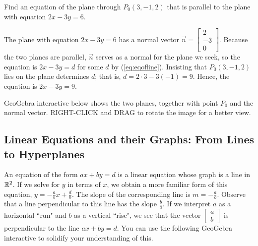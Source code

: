 \documentclass{ximera}
\begin{document}
\begin{example}\label{ex:planeparalleltoplane}
Find an equation of the plane through $P_{0}(3, -1, 2)$ that is parallel to the plane with equation $2x - 3y = 6$.

\begin{explanation}
The plane with equation $2x -3y = 6$ has a normal vector $\vec{n} =
\begin{bmatrix}
2\\
-3\\
0
\end{bmatrix}$. Because the two planes are parallel, $\vec{n}$ serves as a normal for the plane we seek, so the equation is $2x - 3y = d$ for some $d$ by (\ref{eq:eqofline}). Insisting that $P_{0}(3, -1, 2)$ lies on the plane determines $d$; that is, $d = 2 \cdot 3 - 3(-1) = 9$. Hence, the equation is $2x - 3y = 9$.

GeoGebra interactive below shows the two planes, together with point $P_0$ and the normal vector.  RIGHT-CLICK and DRAG to rotate the image for a better view.


\begin{onlineOnly}
\begin{center} 
\end{center}
\end{onlineOnly}
\end{explanation}
\end{example}

\subsection*{Linear Equations and their Graphs: From Lines to Hyperplanes}
An equation of the form $ax+by=d$ is a linear equation whose graph is a line in $\mathbb{R}^2$. If we solve for $y$ in terms of $x$, we obtain a more familiar form of this equation, $y=-\frac{a}{b}x+\frac{d}{b}$.  The slope of the corresponding line is $m=-\frac{a}{b}$.  Observe that a line perpendicular to this line has the slope $\frac{b}{a}$.  If we interpret $a$ as a horizontal ``run" and $b$ as a vertical ``rise", we see that the vector $\begin{bmatrix}a\\b\end{bmatrix}$ is perpendicular to the line $ax+by=d$.  You can use the following GeoGebra interactive to solidify your understanding of this.
\end{document}
